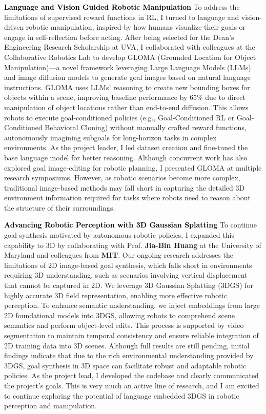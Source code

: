 \documentclass[11pt]{article}
\newcommand{\statement}[1]{\medskip\noindent
  \textcolor{black}{\textbf{#1}}\space
}
\begin{document}
\statement{Language and Vision Guided Robotic Manipulation} To address the limitations of supervised reward functions in RL, I turned to language and vision-driven robotic manipulation, inspired by how humans visualize their goals or engage in self-reflection before acting. After being selected for the Dean's Engineering Research Scholarship at UVA, I collaborated with colleagues at the Collaborative Robotics Lab to develop GLOMA (Grounded Location for Object Manipulation)—a novel framework leveraging Large Language Models (LLMs) and image diffusion models to generate goal images based on natural language instructions. GLOMA uses LLMs' reasoning to create new bounding boxes for objects within a scene, improving baseline performance by 65\% due to direct manipulation of object locations rather than end-to-end diffusion. This allows robots to execute goal-conditioned policies (e.g., Goal-Conditioned RL or Goal-Conditioned Behavioral Cloning) without manually crafted reward functions, autonomously imagining subgoals for long-horizon tasks in complex environments. As the project leader, I led dataset creation and fine-tuned the base language model for better reasoning. Although concurrent work has also explored goal image-editing for robotic planning, I presented GLOMA at multiple research symposiums. However, as robotic scenarios become more complex, traditional image-based methods may fall short in capturing the detailed 3D environment information required for tasks where robots need to reason about the structure of their surroundings.

\statement{Advancing Robotic Perception with 3D Gaussian Splatting} To continue goal synthesis motivated by autonomous robotic policies, I expanded this capability to 3D by collaborating with Prof. \textbf{Jia-Bin Huang} at the University of Maryland and colleagues from \textbf{MIT}. Our ongoing research addresses the limitations of 2D image-based goal synthesis, which falls short in environments requiring 3D understanding, such as scenarios involving vertical displacement that cannot be captured in 2D. We leverage 3D Gaussian Splatting (3DGS) for highly accurate 3D field representation, enabling more effective robotic perception. To enhance semantic understanding, we inject embeddings from large 2D foundational models into 3DGS, allowing robots to comprehend scene semantics and perform object-level edits. This process is supported by video segmentation to maintain temporal consistency and ensure reliable integration of 2D training data into 3D scenes. Although full results are still pending, initial findings indicate that due to the rich environmental understanding provided by 3DGS, goal synthesis in 3D space can facilitate robust and adaptable robotic policies. As the project lead, I developed the codebase and clearly communicated the project's goals. This is very much an active line of research, and I am excited to continue exploring the potential of language embedded 3DGS in robotic perception and manipulation.
\end{document}
